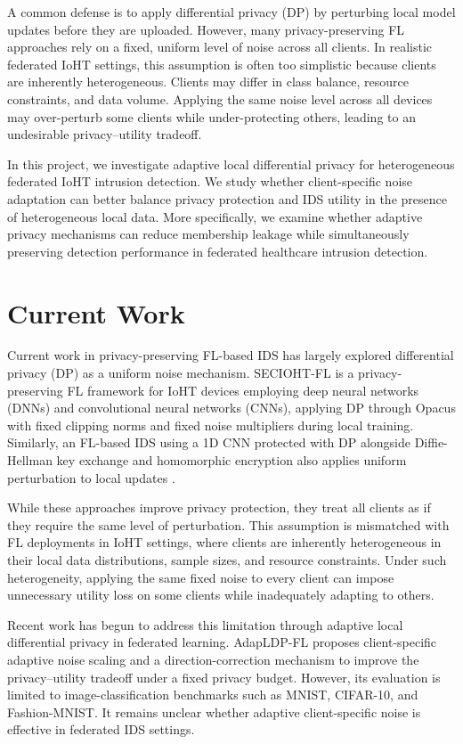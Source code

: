 \documentclass[letterpaper]{article}
\begin{document}
A common defense is to apply differential privacy (DP) by perturbing local model updates before they are uploaded. However, many privacy-preserving FL approaches rely on a fixed, uniform level of noise across all clients. In realistic federated IoHT settings, this assumption is often too simplistic because clients are inherently heterogeneous. Clients may differ in class balance, resource constraints, and data volume. Applying the same noise level across all devices may over-perturb some clients while under-protecting others, leading to an undesirable privacy--utility tradeoff.

In this project, we investigate adaptive local differential privacy for heterogeneous federated IoHT intrusion detection. We study whether client-specific noise adaptation can better balance privacy protection and IDS utility in the presence of heterogeneous local data. More specifically, we examine whether adaptive privacy mechanisms can reduce membership leakage while simultaneously preserving detection performance in federated healthcare intrusion detection.

\pagebreak

\section{Current Work}
Current work in privacy-preserving FL-based IDS has largely explored differential privacy (DP) as a uniform noise mechanism. SECIOHT-FL \cite{mosaiyebzadeh2025} is a privacy-preserving FL framework for IoHT devices employing deep neural networks (DNNs) and convolutional neural networks (CNNs), applying DP through Opacus with fixed clipping norms and fixed noise multipliers during local training. Similarly, an FL-based IDS using a 1D CNN protected with DP alongside Diffie-Hellman key exchange and homomorphic encryption also applies uniform perturbation to local updates \cite{torre2025}.

While these approaches improve privacy protection, they treat all clients as if they require the same level of perturbation. This assumption is mismatched with FL deployments in IoHT settings, where clients are inherently heterogeneous in their local data distributions, sample sizes, and resource constraints. Under such heterogeneity, applying the same fixed noise to every client can impose unnecessary utility loss on some clients while inadequately adapting to others.

Recent work has begun to address this limitation through adaptive local differential privacy in federated learning. AdapLDP-FL \cite{yue2025adapldpfl} proposes client-specific adaptive noise scaling and a direction-correction mechanism to improve the privacy--utility tradeoff under a fixed privacy budget. However, its evaluation is limited to image-classification benchmarks such as MNIST, CIFAR-10, and Fashion-MNIST. It remains unclear whether adaptive client-specific noise is effective in federated IDS settings.
\end{document}
